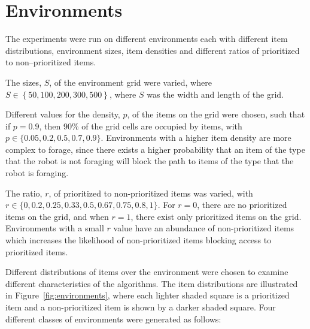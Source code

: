 \section{Environments}
\label{experimentenvironments}

The experiments were run on different environments each with different item distributions, environment sizes, item densities and different ratios of prioritized to non--prioritized items. 

The sizes, $S$, of the environment grid were varied, where $S\in \left\{ 50, 100, 200, 300, 500\right\}$, where $S$ was the width and length of the grid.

Different values for the density, $p$, of the items on the grid were chosen, such that if $p=0.9$, then 90\% of the grid cells are occupied by items, with $p\in \{ 0.05,\allowbreak 0.2,\allowbreak 0.5,\allowbreak 0.7,\allowbreak 0.9\}$. Environments with a higher item density are more complex to forage, since there exists a higher probability that an item of the type that the robot is not foraging will block the path to items of the type that the robot is foraging.

The ratio, $r$, of prioritized to non-prioritized items was varied, with $r\in \{0,\allowbreak 0.2,\allowbreak 0.25,\allowbreak 0.33,\allowbreak 0.5,\allowbreak 0.67,\allowbreak 0.75,\allowbreak 0.8, 1\}$. For $r=0$, there are no prioritized items on the grid, and when $r=1$, there exist only prioritized items on the grid. Environments with a small $r$ value have an abundance of non-prioritized items which increases the likelihood of non-prioritized items blocking access to prioritized items. 

Different distributions of items over the environment were chosen to examine different characteristics of the algorithms. The item distributions are illustrated in Figure~\ref{fig:environments}, where each lighter shaded square is a prioritized item and a non-prioritized item is shown by a darker shaded square. Four different classes of environments were generated as follows:

